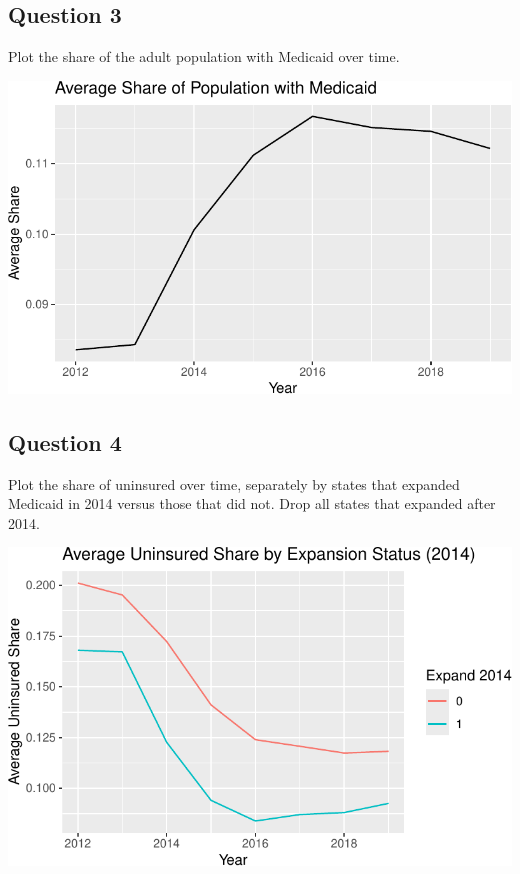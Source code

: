 \documentclass[
]{article}
\begin{document}
\subsection{Question 3}\label{question-3}

Plot the share of the adult population with Medicaid over time.

\includegraphics{ephraim-m-hwk5-1_files/figure-pdf/unnamed-chunk-2-1.pdf}

\subsection{Question 4}\label{question-4}

Plot the share of uninsured over time, separately by states that
expanded Medicaid in 2014 versus those that did not. Drop all states
that expanded after 2014.

\includegraphics{ephraim-m-hwk5-1_files/figure-pdf/unnamed-chunk-3-1.pdf}
\end{document}
